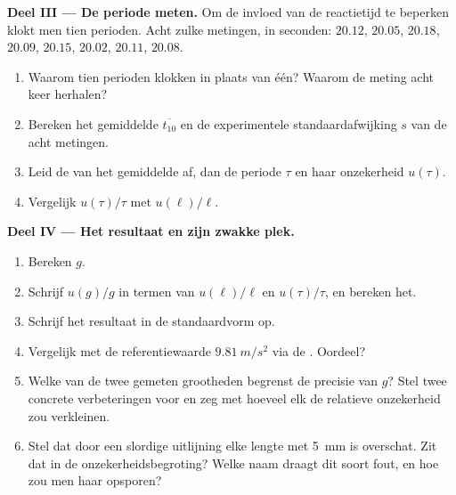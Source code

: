 \begin{problem}
\medskip
\noindent\textbf{Deel III --- De periode meten.}
Om de invloed van de reactietijd te beperken klokt men tien perioden. Acht
zulke metingen, in seconden: $20.12$, $20.05$, $20.18$, $20.09$, $20.15$,
$20.02$, $20.11$, $20.08$.
\begin{enumerate}[resume]
  \item Waarom tien perioden klokken in plaats van één? Waarom de meting
        acht keer herhalen?
  \item Bereken het gemiddelde $\overline{t_{10}}$ en de experimentele
        standaardafwijking $s$ van de acht metingen.
  \item Leid de  van het gemiddelde af, dan de periode
        $\tau$ en haar onzekerheid $u(\tau)$.
  \item Vergelijk $u(\tau)/\tau$ met $u(\ell)/\ell$.
\end{enumerate}

\medskip
\noindent\textbf{Deel IV --- Het resultaat en zijn zwakke plek.}
\begin{enumerate}[resume]
  \item Bereken $g$.
  \item Schrijf $u(g)/g$ in termen van $u(\ell)/\ell$ en $u(\tau)/\tau$,
        en bereken het.
  \item Schrijf het resultaat in de standaardvorm op.
  \item Vergelijk met de referentiewaarde $\qty{9.81}{m/s^2}$ via de
        . Oordeel?
  \item Welke van de twee gemeten grootheden begrenst de precisie van
        $g$? Stel twee concrete verbeteringen voor en zeg met hoeveel elk
        de relatieve onzekerheid zou verkleinen.
  \item Stel dat door een slordige uitlijning elke lengte met \qty{5}{mm}
        is overschat. Zit dat in de onzekerheidsbegroting? Welke naam
        draagt dit soort fout, en hoe zou men haar opsporen?
\end{enumerate}


\end{problem}
